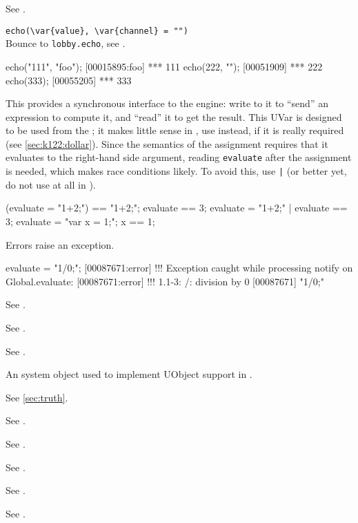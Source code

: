 \begin{urbiscriptapi}
\item[Duration] See .

\item \lstinline|echo(\var{value}, \var{channel} = "")|\\
  Bounce to \lstinline|lobby.echo|, see .
\begin{urbiscript}
echo("111", "foo");
[00015895:foo] *** 111
echo(222, "");
[00051909] *** 222
echo(333);
[00055205] *** 333
\end{urbiscript}

\item[evaluate] This  provides a synchronous interface
  to the \urbi engine: write to it to ``send'' an expression to
  compute it, and ``read'' it to get the result.  This UVar is
  designed to be used from the \Cxx; it makes little sense in \us, use
   instead, if it is really required (see
  \autoref{sec:k122:dollar}).  Since the semantics of the assignment
  requires that it evaluates to the right-hand side argument, reading
  \lstinline|evaluate| after the assignment is needed, which makes
  race conditions likely.  To avoid this, use \lstinline{|} (or better
  yet, do not use  at all in \us).

\begin{urbiassert}
(evaluate = "1+2;") == "1+2;";
 evaluate == 3;
{ evaluate = "1+2;" | evaluate } == 3;
{ evaluate = "var x = 1;"; x } == 1;
\end{urbiassert}

  Errors raise an exception.

\begin{urbiscript}
evaluate = "1/0;";
[00087671:error] !!! Exception caught while processing notify on Global.evaluate:
[00087671:error] !!! 1.1-3: /: division by 0
[00087671] "1/0;"
\end{urbiscript}

\item[Event] See .
\item[Exception] See .
\item[Executable] See .
\item[external] An system object used to implement UObject support in
  \us.
\item[false]  See \autoref{sec:truth}.
\item[File] See .
\item[Finalizable] See .
\item[Float] See .
\item[FormatInfo] See .
\item[Formatter] See .


\end{urbiscriptapi}
